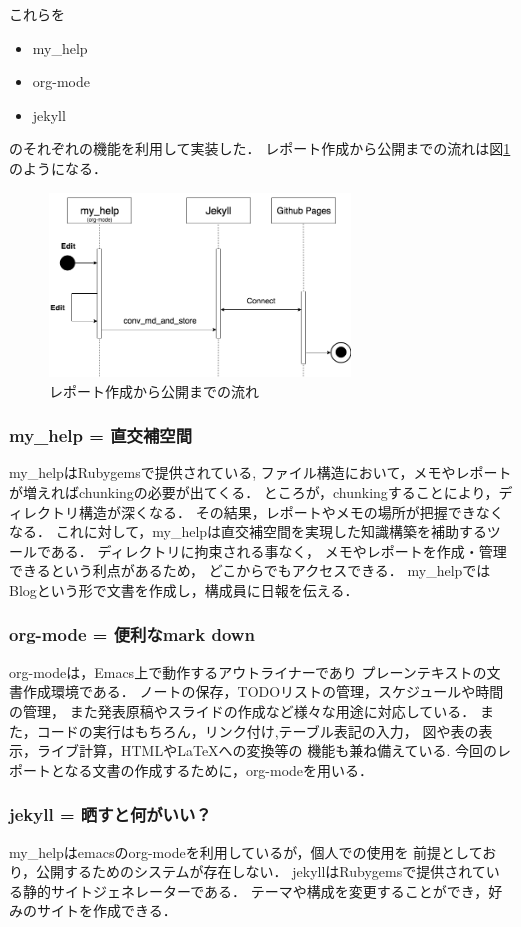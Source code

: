 \documentclass[a4,p11]{article}
\begin{document}
これらを
\begin{itemize}
\item my\_help
\item org-mode
\item jekyll
\end{itemize}
のそれぞれの機能を利用して実装した．
レポート作成から公開までの流れは図\ref{fig:orgaf5a885}のようになる．
\begin{figure}[htbp]
\centering
\includegraphics[width=8cm]{./images/myhelp_to_jekyll.png}
\caption{\label{fig:orgaf5a885}
レポート作成から公開までの流れ}
\end{figure}

\subsubsection{my\_help = 直交補空間}
\label{sec:org934235a}
my\_helpはRubygemsで提供されている,
ファイル構造において，メモやレポートが増えればchunkingの必要が出てくる．
ところが，chunkingすることにより，ディレクトリ構造が深くなる．
その結果，レポートやメモの場所が把握できなくなる．
これに対して，my\_helpは直交補空間を実現した知識構築を補助するツールである．
ディレクトリに拘束される事なく，
メモやレポートを作成・管理できるという利点があるため，
どこからでもアクセスできる．
my\_helpではBlogという形で文書を作成し，構成員に日報を伝える．

\subsubsection{org-mode = 便利なmark down}
\label{sec:org7602308}
org-modeは，Emacs上で動作するアウトライナーであり
プレーンテキストの文書作成環境である．
ノートの保存，TODOリストの管理，スケジュールや時間の管理，
また発表原稿やスライドの作成など様々な用途に対応している．
また，コードの実行はもちろん，リンク付け,テーブル表記の入力，
図や表の表示，ライブ計算，HTMLや\LaTeX{}への変換等の
機能も兼ね備えている.
今回のレポートとなる文書の作成するために，org-modeを用いる．

\subsubsection{jekyll = 晒すと何がいい？}
\label{sec:orgc3e7d34}
my\_helpはemacsのorg-modeを利用しているが，個人での使用を
前提としており，公開するためのシステムが存在しない．
jekyllはRubygemsで提供されている静的サイトジェネレーターである．
テーマや構成を変更することができ，好みのサイトを作成できる．
\end{document}
